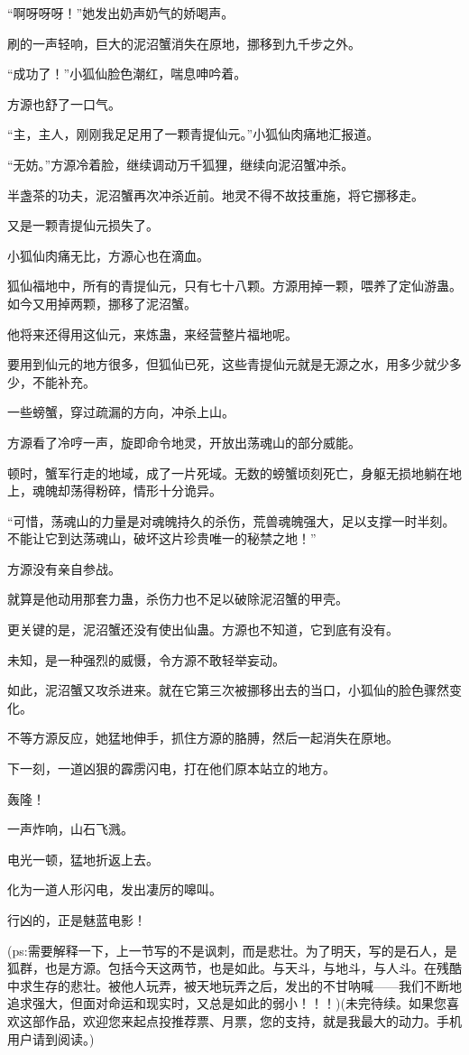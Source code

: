 \begin{this_body}
“啊呀呀呀！”她发出奶声奶气的娇喝声。

刷的一声轻响，巨大的泥沼蟹消失在原地，挪移到九千步之外。

“成功了！”小狐仙脸色潮红，喘息呻吟着。

方源也舒了一口气。

“主，主人，刚刚我足足用了一颗青提仙元。”小狐仙肉痛地汇报道。

“无妨。”方源冷着脸，继续调动万千狐狸，继续向泥沼蟹冲杀。

半盏茶的功夫，泥沼蟹再次冲杀近前。地灵不得不故技重施，将它挪移走。

又是一颗青提仙元损失了。

小狐仙肉痛无比，方源心也在滴血。

狐仙福地中，所有的青提仙元，只有七十八颗。方源用掉一颗，喂养了定仙游蛊。如今又用掉两颗，挪移了泥沼蟹。

他将来还得用这仙元，来炼蛊，来经营整片福地呢。

要用到仙元的地方很多，但狐仙已死，这些青提仙元就是无源之水，用多少就少多少，不能补充。

一些螃蟹，穿过疏漏的方向，冲杀上山。

方源看了冷哼一声，旋即命令地灵，开放出荡魂山的部分威能。

顿时，蟹军行走的地域，成了一片死域。无数的螃蟹顷刻死亡，身躯无损地躺在地上，魂魄却荡得粉碎，情形十分诡异。

“可惜，荡魂山的力量是对魂魄持久的杀伤，荒兽魂魄强大，足以支撑一时半刻。不能让它到达荡魂山，破坏这片珍贵唯一的秘禁之地！”

方源没有亲自参战。

就算是他动用那套力蛊，杀伤力也不足以破除泥沼蟹的甲壳。

更关键的是，泥沼蟹还没有使出仙蛊。方源也不知道，它到底有没有。

未知，是一种强烈的威慑，令方源不敢轻举妄动。

如此，泥沼蟹又攻杀进来。就在它第三次被挪移出去的当口，小狐仙的脸色骤然变化。

不等方源反应，她猛地伸手，抓住方源的胳膊，然后一起消失在原地。

下一刻，一道凶狠的霹雳闪电，打在他们原本站立的地方。

轰隆！

一声炸响，山石飞溅。

电光一顿，猛地折返上去。

化为一道人形闪电，发出凄厉的嗥叫。

行凶的，正是魅蓝电影！

(ps:需要解释一下，上一节写的不是讽刺，而是悲壮。为了明天，写的是石人，是狐群，也是方源。包括今天这两节，也是如此。与天斗，与地斗，与人斗。在残酷中求生存的悲壮。被他人玩弄，被天地玩弄之后，发出的不甘呐喊——我们不断地追求强大，但面对命运和现实时，又总是如此的弱小！！！)(未完待续。如果您喜欢这部作品，欢迎您来起点投推荐票、月票，您的支持，就是我最大的动力。手机用户请到阅读。)

\end{this_body}

